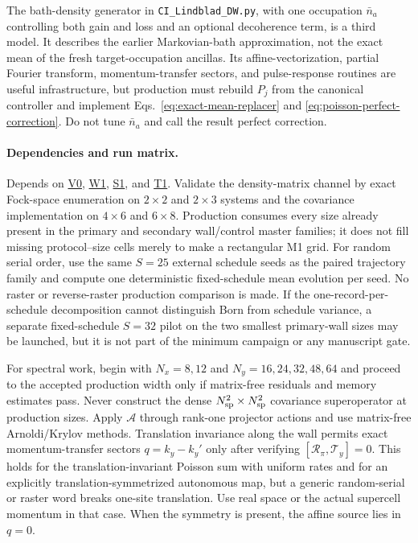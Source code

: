\documentclass[aps,prx,twocolumn,floatfix,nofootinbib,superscriptaddress,longbibliography]{revtex4-2}
\newcommand{\code}[1]{\texttt{#1}}
\newcommand{\campref}[1]{\hyperref[camp:#1]{#1}}
\begin{document}
The bath-density generator in \code{CI\_Lindblad\_DW.py}, with one occupation
$\bar n_a$ controlling both gain and loss and an optional decoherence term, is a third
model.  It describes the earlier Markovian-bath approximation, not the exact mean of the
fresh target-occupation ancillas.  Its affine-vectorization, partial Fourier transform,
momentum-transfer sectors, and pulse-response routines are useful infrastructure, but
production must rebuild $P_j$ from the canonical controller and implement
Eqs.~\eqref{eq:exact-mean-replacer} and \eqref{eq:poisson-perfect-correction}.  Do not tune
$\bar n_a$ and call the result perfect correction.

\paragraph*{Dependencies and run matrix.}
Depends on \campref{V0}, \campref{W1}, \campref{S1}, and \campref{T1}.  Validate the density-matrix channel by exact Fock-space
enumeration on $2\times2$ and $2\times3$ systems and the covariance implementation on
$4\times6$ and $6\times8$.  Production consumes every size already present in the primary
and secondary wall/control master families; it does not fill missing protocol--size cells
merely to make a rectangular M1 grid.  For random serial order, use the same $S=25$
external schedule seeds as the paired trajectory family and compute one deterministic
fixed-schedule mean evolution per seed.  No raster or reverse-raster production comparison
is made.  If the one-record-per-schedule decomposition
cannot distinguish Born from schedule variance, a separate fixed-schedule $S=32$ pilot on
the two smallest primary-wall sizes may be launched, but it is not part of the minimum
campaign or any manuscript gate.

For spectral work, begin with $N_x=8,12$ and $N_y=16,24,32,48,64$ and proceed to the
accepted production width only if matrix-free residuals and memory estimates pass.
Never construct the dense $N_{\rm sp}^2\times N_{\rm sp}^2$ covariance superoperator at
production sizes.  Apply $\mathcal A$ through rank-one projector actions and use
matrix-free Arnoldi/Krylov methods.  Translation invariance along the wall permits exact
momentum-transfer sectors $q=k_y-k_y'$ only after verifying
$[\mathcal R_\pi,\mathcal T_y]=0$.  This holds for the translation-invariant Poisson sum
with uniform rates and for an explicitly translation-symmetrized autonomous map, but a
generic random-serial or raster word breaks one-site translation.  Use real space or the actual
supercell momentum in that case.  When the symmetry is present, the affine source lies in
$q=0$.
\end{document}
